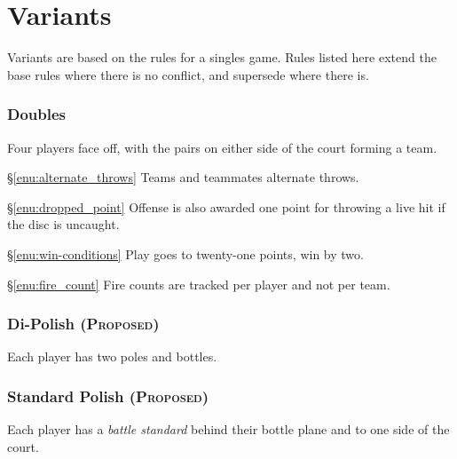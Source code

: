 \documentclass[11pt,letterpaper,twocolumn,english,DIV=calc]{scrartcl}
\newcommand{\proposed}{{\color{DarkRed}\textsc{(Proposed)} }}
\begin{document}


\part*{Variants}
\label{part:variants}

Variants are based on the rules for a singles game. Rules listed here extend the base rules where there is no conflict, and supersede where there is.

\section{Doubles}
Four players face off, with the pairs on either side of the court forming a team. 

\begin{description}
	\item{\S\ref{enu:alternate_throws}} Teams and teammates alternate throws. 
	\item{\S\ref{enu:dropped_point}} Offense is also awarded one point for throwing a live hit if the disc is uncaught.
	\item{\S\ref{enu:win-conditions}} Play goes to twenty-one points, win by two.
	\item{\S\ref{enu:fire_count}} Fire counts are tracked per player and not per team.
\end{description}

\section{Di-Polish \proposed}
Each player has two poles and bottles.

\section{Standard Polish \proposed}
Each player has a \emph{battle standard} behind their bottle plane and to one side of the court.



\end{document}
